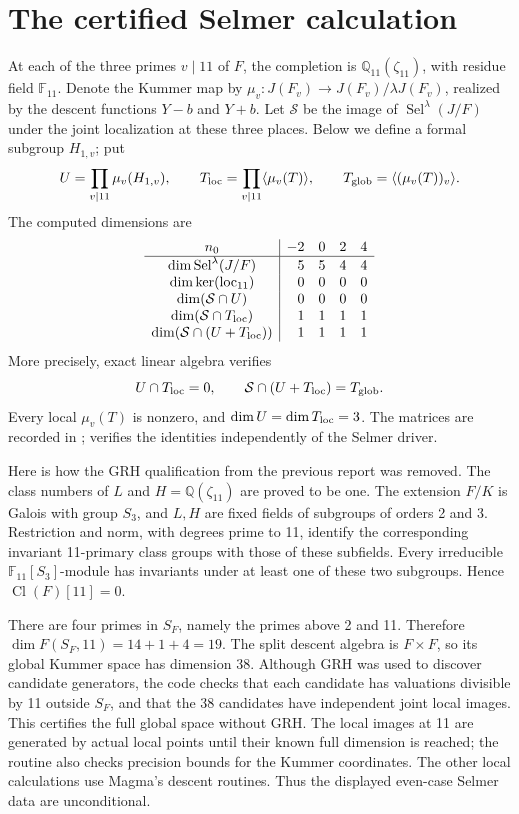 \documentclass[11pt]{article}
\newcommand{\Q}{\mathbb Q}\newcommand{\F}{\mathbb F}
\newcommand{\Sel}{\operatorname{Sel}}
\newcommand{\Cl}{\operatorname{Cl}}
\begin{document}
\section{The certified Selmer calculation}
At each of the three primes \(v\mid11\) of \(F\), the completion is
\(\Q_{11}(\zeta_{11})\), with residue field \(\F_{11}\). Denote the
Kummer map by \(\mu_v:J(F_v)\to J(F_v)/\lambda J(F_v)\), realized by
the descent functions \(Y-b\) and \(Y+b\).
Let \(\mathcal S\) be the image of \(\Sel^\lambda(J/F)\) under the
joint localization at these three places. Below we define a formal
subgroup \(H_{1,v}\); put
\[
 U=\prod_{v\mid11}\mu_v(H_{1,v}),\qquad
 T_{\rm loc}=\prod_{v\mid11}\langle\mu_v(T)\rangle,
 \qquad T_{\rm glob}=\langle(\mu_v(T))_v\rangle.
\]
The computed dimensions are
\[
\begin{array}{c|rrrr}
 n_0&-2&0&2&4\\\hline
 \dim\Sel^\lambda(J/F)&5&5&4&4\\
 \dim\ker(\mathrm{loc}_{11})&0&0&0&0\\
 \dim(\mathcal S\cap U)&0&0&0&0\\
 \dim(\mathcal S\cap T_{\rm loc})&1&1&1&1\\
 \dim(\mathcal S\cap(U+T_{\rm loc}))&1&1&1&1
\end{array}
\]
More precisely, exact linear algebra verifies
\begin{equation}\label{eq:intersection}
 U\cap T_{\rm loc}=0,\qquad
 \mathcal S\cap(U+T_{\rm loc})=T_{\rm glob}.
\end{equation}
Every local \(\mu_v(T)\) is nonzero, and \(\dim U=\dim T_{\rm loc}=3\).
The matrices are recorded in ;
 verifies the identities independently of the
Selmer driver.

Here is how the GRH qualification from the previous report was removed.
The class numbers of \(L\) and \(H=\Q(\zeta_{11})\) are proved to be
one. The extension \(F/K\) is Galois with group \(S_3\), and \(L,H\)
are fixed fields of subgroups of orders 2 and 3. Restriction and norm,
with degrees prime to 11, identify the corresponding invariant
11-primary class groups with those of these subfields. Every irreducible
\(\F_{11}[S_3]\)-module has invariants under at least one of these two
subgroups. Hence \(\Cl(F)[11]=0\).

There are four primes in \(S_F\), namely the primes above 2 and 11.
Therefore \(\dim F(S_F,11)=14+1+4=19\). The split descent algebra is
\(F\times F\), so its global Kummer space has dimension 38. Although
GRH was used to discover candidate generators, the code checks that
each candidate has valuations divisible by 11 outside \(S_F\), and
that the 38 candidates have independent joint local images. This
certifies the full global space without GRH. The local images at 11
are generated by actual local points until their known full dimension
is reached; the routine also checks precision bounds for the Kummer
coordinates. The other local calculations use Magma's descent routines.
Thus the displayed even-case Selmer data are unconditional.
\end{document}
